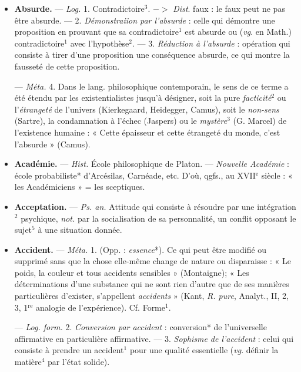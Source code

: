 \begin{itemize}[leftmargin=1cm, label=, itemsep=1pt]
\item {\bf Absurde.} — \textsf{\textit {Log.}} 1. Contradictoire$^3$.
$->$ {\it Dist}. faux : le faux peut ne pas
être absurde. — 2. {\it Démonstraiion
par l'absurde} : celle qui démontre
une proposition en prouvant que sa
contradictoire$^1$ est absurde ou ({\it vg}.
en Math.) contradictoire$^1$ avec l’hypothèse$^2$. — 3. {\it Réduction à l'absurde} :
opération qui consiste à tirer d’une
proposition une conséquence absurde,
ce qui montre la fausseté de cette
proposition.

— \textsf{\textit {Méta.}} 4. Dans le lang. philosophique contemporain, le sens de
ce terme a été étendu par les existentialistes jusqu’à désigner, soit la
pure {\it facticité}$^2$ ou l'{\it étrangeté} de l'univers (Kierkegaard, Heidegger, Camus),
soit le {\it non-sens} (Sartre), la
condamnation à l'échec (Jaspers) ou
le {\it mystère}$^3$ (G. Marcel) de l'existence
humaine : « Cette épaisseur et cette
étrangeté du monde, c’est l'absurde »
(Camus).

\item {\bf Académie.} — \textsf{\textit {Hist.}} École philosophique de Platon.
— {\it Nouvelle Académie} :
école probabiliste* d’Arcésilas, Carnéade, etc. D'où, qgfs., au
{\footnotesize XVII}$^\text{e}$ siècle : « les Académiciens »
= les sceptiques.

\item {\bf Acceptation.} — \textsf{\textit {Ps. an.}} Attitude qui
consiste à résoudre par une intégration$^2$ psychique, {\it not.} par la socialisation
de sa personnalité, un conflit
opposant le sujet$^5$ à une situation
donnée.

\item {\bf Accident.} — \textsf{\textit {Méta.}} 1. (Opp. : {\it essence}*).
Ce qui peut être modifié ou supprimé sans que la chose elle-même
change de nature ou disparaisse :
« Le poids, la couleur et tous accidents sensibles » (Montaigne); « Les
déterminations d’une substance qui
ne sont rien d’autre que de ses manières particulières d'exister,
s’appellent {\it accidents} » (Kant, {\it R. pure},
Analyt., II, 2, 3, 1$^\text{re}$ analogie de l’expérience). Cf. {\it }Forme$^1$.

— \textsf{\textit {Log. form.}} 2. {\it Conversion par
accident} : conversion* de l’universelle affirmative en particulière
affirmative. — 3. {\it Sophisme de l’accident} : celui qui consiste à prendre
un accident$^1$ pour une qualité essentielle ({\it vg}. définir la matière$^4$ par
l’état solide).


\end{itemize}
